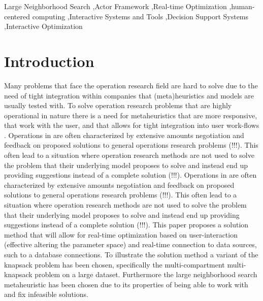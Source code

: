 \documentclass[preprint,12pt,authoryear]{elsarticle}
\begin{document}
\begin{frontmatter}
\begin{keyword}
Large Neighborhood Search \sep Actor Framework \sep Real-time Optimization \sep human-centered computing \sep Interactive Systems and Tools \sep Decision Support Systems \sep Interactive Optimization




\end{keyword}

\end{frontmatter}



\section{Introduction}
\label{sec1}
Many problems that face the operation research field are hard to solve due to the need of tight integration within companies that (meta)heuristics and models 
are usually tested with. To solve operation research problems that are highly operational in nature there is a need for metaheuristics that are more 
responsive, that work with the user, and that allows for tight integration into user work-flows \cite{interactive-optimization-methods}. Operations in are often
characterized by extensive amounts negotiation and feedback on proposed solutions to general operations research problems (!!!). This often lead to a situation
where operation research methods are not used to solve the problem that their underlying model proposes to solve and instead end up providing suggestions 
instead of a complete solution (!!!). Operations in are often
characterized by extensive amounts negotiation and feedback on proposed solutions to general operations research problems (!!!). This often lead to a situation
where operation research methods are not used to solve the problem that their underlying model proposes to solve and instead end up providing suggestions 
instead of a complete solution (!!!). This paper proposes a solution method that will allow for real-time optimization based on user-interaction (effective 
altering the parameter space) and real-time connection to data sources, such to a database connections. To illustrate the solution method a variant of the
knapsack problem has been chosen, specifically the multi-compartment multi-knapsack problem on a large dataset. Furthermore the large neighborhood search 
metaheuristic has been chosen due to its properties of being able to work with and fix infeasible solutions. 
\end{document}
